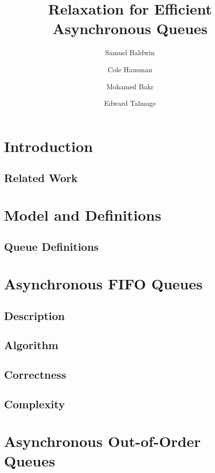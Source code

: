 \documentclass[a4paper,USenglish]{lipics-v2021} %
\title{Relaxation for Efficient Asynchronous Queues}
\author{Samuel Baldwin}{Bucknell University, USA}{}{https://orcid.org/0000-0002-1825-0097}{}
\author{Cole Hausman}{Bucknell University, USA}{}{[orcid]}{}
\author{Mohamed Bakr}{Bucknell University, USA}{}{ORCID}{}
\author{Edward Talmage}{Bucknell Univserity, USA}{elt006@bucknell.edu}{ORCID}{}
\begin{document}
\maketitle

\section{Introduction}

\subsection{Related Work}

\section{Model and Definitions}

\subsection{Queue Definitions}

\section{Asynchronous FIFO Queues}

\subsection{Description}

\subsection{Algorithm}

\subsection{Correctness}

\subsection{Complexity}

\section{Asynchronous Out-of-Order Queues}
\end{document}
